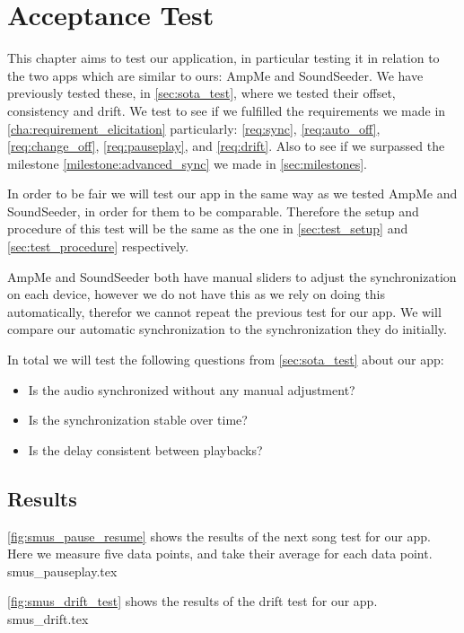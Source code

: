 \chapter{Acceptance Test}\label{cha:acctest}
This chapter aims to test our application, in particular testing it in relation to the two apps which are similar to ours: AmpMe and SoundSeeder.
We have previously tested these, in \vref{sec:sota_test}, where we tested their offset, consistency and drift.
We test to see if we fulfilled the requirements we made in \vref{cha:requirement_elicitation} particularly: \ref{req:sync}, \ref{req:auto_off}, \ref{req:change_off}, \ref{req:pauseplay}, and \ref{req:drift}.
Also to see if we surpassed the milestone \ref{milestone:advanced_sync} we made in \vref{sec:milestones}.

In order to be fair we will test our app in the same way as we tested AmpMe and SoundSeeder, in order for them to be comparable.
Therefore the setup and procedure of this test will be the same as the one in \vref{sec:test_setup} and \vref{sec:test_procedure} respectively.

AmpMe and SoundSeeder both have manual sliders to adjust the synchronization on each device, however we do not have this as we rely on doing this automatically, therefor we cannot repeat the previous test for our app.
We will compare our automatic synchronization to the synchronization they do initially.

In total we will test the following questions from \vref{sec:sota_test} about our app:
\begin{itemize}
    \item Is the audio synchronized without any manual adjustment?
    \item Is the synchronization stable over time?
    \item Is the delay consistent between playbacks?
\end{itemize}

\section{Results}

\vref{fig:smus_pause_resume} shows the results of the next song test for our app.
Here we measure five data points, and take their average for each data point.
{smus_pauseplay.tex}

\vref{fig:smus_drift_test} shows the results of the drift test for our app.
{smus_drift.tex}

